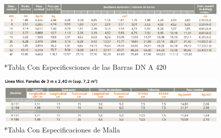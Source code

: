 \documentclass[12pt,a4paper]{article}
\begin{document}
 \begin{figure}[H]    
    \centering         
    \includegraphics[width=1\textwidth]{Inagenes para latex/13.png}
    \caption*{*Tabla Con Especificsciones de las Barras  DN A 420\textsuperscript{\textregistered}}
\end{figure}
\begin{figure}[H]    
    \centering         
    \includegraphics[width=1\textwidth]{Inagenes para latex/14.png}
    \caption*{*Tabla Con Especificaciones de Malla}
\end{figure}
\end{document}
